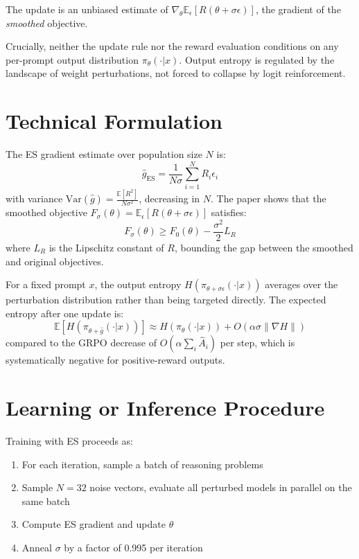 \documentclass[10pt,twocolumn]{article}
\begin{document}
The update is an unbiased estimate of
$\nabla_\theta \mathbb{E}_\epsilon[R(\theta + \sigma\epsilon)]$,
the gradient of the \emph{smoothed} objective.

Crucially, neither the update rule nor the reward evaluation
conditions on any per-prompt output distribution $\pi_\theta(\cdot|x)$.
Output entropy is regulated by the landscape of weight perturbations,
not forced to collapse by logit reinforcement.

\section{Technical Formulation}

The ES gradient estimate over population size $N$ is:
\[
  \hat{g}_\text{ES} = \frac{1}{N\sigma}\sum_{i=1}^N R_i \epsilon_i
\]
with variance $\text{Var}(\hat{g}) = \frac{\mathbb{E}[R^2]}{N\sigma^2}$,
decreasing in $N$. The paper shows that the smoothed objective
$F_\sigma(\theta) = \mathbb{E}_\epsilon[R(\theta + \sigma\epsilon)]$
satisfies:
\[
  F_\sigma(\theta) \geq F_0(\theta) - \frac{\sigma^2}{2}L_R
\]
where $L_R$ is the Lipschitz constant of $R$, bounding the gap
between the smoothed and original objectives.

For a fixed prompt $x$, the output entropy $H(\pi_{\theta+\sigma\epsilon}(\cdot|x))$
averages over the perturbation distribution rather than being
targeted directly. The expected entropy after one update is:
\[
  \mathbb{E}[H(\pi_{\theta+\hat{g}}(\cdot|x))] \approx H(\pi_\theta(\cdot|x))
    + O(\alpha \sigma \|\nabla H\|)
\]
compared to the GRPO decrease of $O(\alpha \sum_i \hat{A}_i)$
per step, which is systematically negative for positive-reward outputs.

\section{Learning or Inference Procedure}

Training with ES proceeds as:
\begin{enumerate}[itemsep=2pt,parsep=0pt]
  \item For each iteration, sample a batch of reasoning problems
  \item Sample $N=32$ noise vectors, evaluate all perturbed models in
    parallel on the same batch
  \item Compute ES gradient and update $\theta$
  \item Anneal $\sigma$ by a factor of 0.995 per iteration
\end{enumerate}
\end{document}
